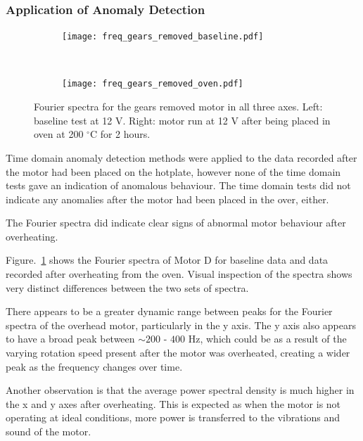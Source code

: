 
\subsubsection{Application of Anomaly Detection}

\begin{figure}[t!]
    \centering
    \begin{subfigure}[t]{0.5\textwidth}
        \centering
        \texttt{[image: freq\_gears\_removed\_baseline.pdf]}
    \end{subfigure}%
    ~ 
    \begin{subfigure}[t]{0.5\textwidth}
        \centering
        \texttt{[image: freq\_gears\_removed\_oven.pdf]}
    \end{subfigure}
    \caption[Fourier Plot Overheating]{Fourier spectra for the gears removed motor in all three axes. Left: baseline test at 12 V. Right: motor run at 12 V after being placed in oven at 200 $^{\circ}$C for 2 hours.}
    \label{fig:overheating_fourier}
\end{figure}

Time domain anomaly detection methods were applied to the data recorded after the motor had been placed on the hotplate, however none of the time domain tests gave an indication of anomalous behaviour. The time domain tests did not indicate any anomalies after the motor had been placed in the over, either. 

The Fourier spectra did indicate clear signs of abnormal motor behaviour after overheating. 

Figure.~\ref{fig:overheating_fourier} shows the Fourier spectra of Motor D for baseline data and data recorded after overheating from the oven. Visual inspection of the spectra shows very distinct differences between the two sets of spectra. 

There appears to be a greater dynamic range between peaks for the Fourier spectra of the overhead motor, particularly in the y axis. The y axis also appears to have a broad peak between $\sim200$ - $400$ Hz, which could be as a result of the varying rotation speed present after the motor was overheated, creating a wider peak as the frequency changes over time.

Another observation is that the average power spectral density is much higher in the x and y axes after overheating. This is expected as when the motor is not operating at ideal conditions, more power is transferred to the vibrations and sound of the motor.

